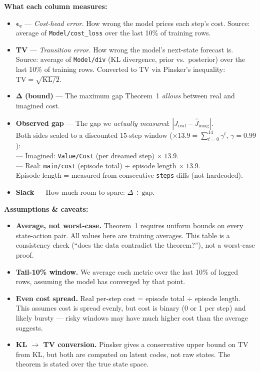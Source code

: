 \documentclass[10pt]{article}
\begin{document}
\vspace{0.8em}
\noindent\textbf{What each column measures:}
\begin{itemize}\setlength\itemsep{0.3em}
  \item $\boldsymbol{\epsilon_c}$ --- \emph{Cost-head error.} How wrong the model prices each step's cost.
        Source: average of \texttt{Model/cost\_loss} over the last 10\% of training rows.
  \item \textbf{TV} --- \emph{Transition error.} How wrong the model's next-state forecast is.
        Source: average of \texttt{Model/div} (KL divergence, prior vs.\ posterior) over the last 10\% of training rows.
        Converted to TV via Pinsker's inequality: $\text{TV} = \sqrt{\text{KL}/2}$.
  \item $\boldsymbol{\Delta}$ \textbf{(bound)} --- The maximum gap Theorem~1 \emph{allows} between real and imagined cost.
  \item \textbf{Observed gap} --- The gap we \emph{actually measured}: $|J_{\text{real}} - \hat{J}_{\text{imag}}|$.\\
        Both sides scaled to a discounted 15-step window ($\times 13.9 = \sum_{t=0}^{14}\gamma^t$, $\gamma=0.99$):\\
        --- Imagined: \texttt{Value/Cost} (per dreamed step) $\times\;13.9$.\\
        --- Real: \texttt{main/cost} (episode total) $\div$ episode length $\times\;13.9$.\\
        Episode length = measured from consecutive \texttt{steps} diffs (not hardcoded).
  \item \textbf{Slack} --- How much room to spare: $\Delta \div \text{gap}$.
\end{itemize}

\vspace{0.8em}
\noindent\textbf{Assumptions \& caveats:}
\begin{itemize}\setlength\itemsep{0.3em}
  \item \textbf{Average, not worst-case.}
        Theorem~1 requires uniform bounds on every state-action pair.
        All values here are training averages.
        This table is a consistency check (``does the data contradict the theorem?''),
        not a worst-case proof.
  \item \textbf{Tail-10\% window.}
        We average each metric over the last 10\% of logged rows,
        assuming the model has converged by that point.
  \item \textbf{Even cost spread.}
        Real per-step cost = episode total $\div$ episode length.
        This assumes cost is spread evenly, but cost is binary (0 or 1 per step)
        and likely bursty --- risky windows may have much higher cost than the average suggests.
  \item \textbf{KL $\to$ TV conversion.}
        Pinsker gives a conservative upper bound on TV from KL,
        but both are computed on latent codes, not raw states.
        The theorem is stated over the true state space.
\end{itemize}
\end{document}
